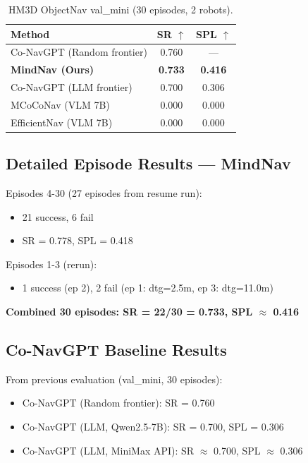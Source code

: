 \begin{table}[h]
\centering
\begin{tabular}{lcc}
\toprule
\textbf{Method} & \textbf{SR} $\uparrow$ & \textbf{SPL} $\uparrow$ \\
\midrule
Co-NavGPT (Random frontier) & 0.760 & --- \\
\textbf{MindNav (Ours)} & \textbf{0.733} & \textbf{0.416} \\
Co-NavGPT (LLM frontier) & 0.700 & 0.306 \\
MCoCoNav (VLM 7B) & 0.000 & 0.000 \\
EfficientNav (VLM 7B) & 0.000 & 0.000 \\
\bottomrule
\end{tabular}
\caption{HM3D ObjectNav val\_mini (30 episodes, 2 robots).}
\end{table}

\subsection{Detailed Episode Results — MindNav}

Episodes 4-30 (27 episodes from resume run):
\begin{itemize}
    \item 21 success, 6 fail
    \item SR = 0.778, SPL = 0.418
\end{itemize}

Episodes 1-3 (rerun):
\begin{itemize}
    \item 1 success (ep 2), 2 fail (ep 1: dtg=2.5m, ep 3: dtg=11.0m)
\end{itemize}

\textbf{Combined 30 episodes: SR = 22/30 = 0.733, SPL $\approx$ 0.416}

\subsection{Co-NavGPT Baseline Results}

From previous evaluation (val\_mini, 30 episodes):
\begin{itemize}
    \item Co-NavGPT (Random frontier): SR = 0.760
    \item Co-NavGPT (LLM, Qwen2.5-7B): SR = 0.700, SPL = 0.306
    \item Co-NavGPT (LLM, MiniMax API): SR $\approx$ 0.700, SPL $\approx$ 0.306
\end{itemize}

